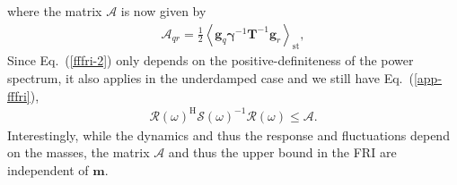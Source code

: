 \documentclass[aps,pre,twocolumn,superscriptaddress,notitlepage]{revtex4-2}
\newcommand{\Av}[1]{\left\langle #1 \right\rangle}
\newcommand{\bmc}[1]{\bm{\mathcal{#1}}}
\renewcommand{\eqref}[1]{Eq.~(\ref{#1})}
\begin{document}
where the matrix $\bmc{A}$ is now given by
\begin{align}
\mathcal{A}_{qr} = \frac{1}{2} \Av{\bm{g}_q \bm{\gamma}^{-1} \bm{T}^{-1} \bm{g}_r}_\text{st} ,
\end{align}
Since \eqref{fffri-2} only depends on the positive-definiteness of the power spectrum, it also applies in the underdamped case and we still have \eqref{app-fffri},
\begin{align}
\bmc{R}(\omega)^\text{H} \bmc{S}(\omega)^{-1} \bmc{R}(\omega) \leq \bmc{A} \label{fffri-under} .
\end{align}
Interestingly, while the dynamics and thus the response and fluctuations depend on the masses, the matrix $\bmc{A}$ and thus the upper bound in the FRI are independent of $\bm{m}$.
\end{document}
